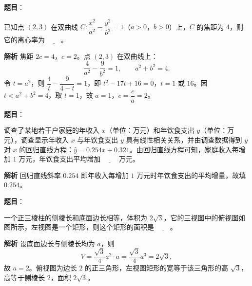 \begin{answer}

\textbf{题目}：

已知点 $(2,3)$ 在双曲线 $C:\dfrac{x^2}{a^2}-\dfrac{y^2}{b^2}=1$（$a>0$，$b>0$）上，$C$ 的焦距为 $4$，则它的离心率为 $\underline{\qquad}$。

\textbf{解析}
焦距 $2c=4$，$c=2$。点 $(2,3)$ 在双曲线上：
\nopagebreak[4]
\[\frac4{a^2}-\frac9{b^2}=1,\qquad a^2+b^2=4.\]
令 $t=a^2$，则 $\dfrac4t-\dfrac9{4-t}=1$，即 $t^2-17t+16=0$，$t=1$ 或 $16$。因 $t<a^2+b^2=4$，取 $t=1$，故 $a=1$，$e=\dfrac ca=2$。


\end{answer}
\begin{answer}

\textbf{题目}：

调查了某地若干户家庭的年收入 $x$（单位：万元）和年饮食支出 $y$（单位：万元），调查显示年收入 $x$ 与年饮食支出 $y$ 具有线性相关关系，并由调查数据得到 $y$ 对 $x$ 的回归直线方程：$\hat y=0.254x+0.321$。由回归直线方程可知，家庭收入每增加 $1$ 万元，年饮食支出平均增加 $\underline{\qquad}$ 万元。

\textbf{解析}
回归直线斜率 $0.254$ 即年收入每增加 $1$ 万元时年饮食支出的平均增量，故填 $0.254$。


\end{answer}
\begin{answer}

\textbf{题目}：

一个正三棱柱的侧棱长和底面边长相等，体积为 $2\sqrt3$，它的三视图中的俯视图如图所示，左视图是一个矩形，则这个矩形的面积是 $\underline{\qquad}$。
\nopagebreak[4]
\begin{center}\end{center}
\nopagebreak[4]
\textbf{解析}
设底面边长与侧棱长均为 $a$，则
\nopagebreak[4]
\[V=\frac{\sqrt3}4a^2\cdot a=\frac{\sqrt3}4a^3=2\sqrt3,\]
故 $a=2$。俯视图为边长 $2$ 的正三角形，左视图矩形的宽等于该三角形的高 $\sqrt3$，高等于侧棱长 $2$，面积 $2\sqrt3$。


\end{answer}
